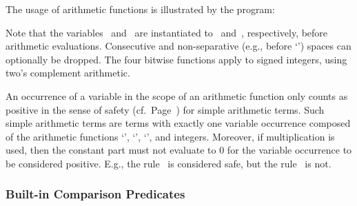 \begin{example}\label{ex:arith:fun}
The usage of arithmetic functions is illustrated by the program:%
%

%
Note that the variables~ and~ are instantiated to~ and~,
respectively, before arithmetic evaluations.
Consecutive and non-separative (e.g., before `\code{(}')
spaces can optionally be dropped.
The four bitwise functions apply to signed integers,
using two's complement arithmetic.
\end{example}

\begin{note}\label{note:simple}
An occurrence of a variable in the scope of an arithmetic function
only counts as positive in the sense of safety (cf.\ Page~\pageref{pg:safe}) for simple arithmetic terms.
Such simple arithmetic terms are terms with exactly one variable occurrence
composed of the arithmetic functions `\code{+}', `\code{-}', `\code{*}', and integers.
Moreover,
if multiplication is used, then the constant part must not evaluate to $0$ for the variable occurrence to be considered positive.
E.g., the rule~
is considered safe, but
the rule~ is not.
\end{note}

\subsubsection{Built-in Comparison Predicates}\label{subsec:gringo:comp}

